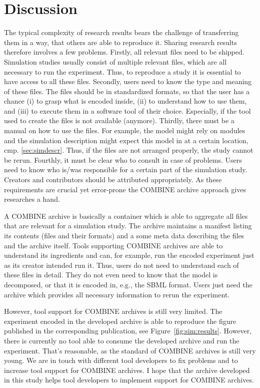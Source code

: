 

\section{Discussion}
The typical complexity of research results bears the challenge of transferring them in a way, that others are able to reproduce it.
Sharing research results therefore involves a few problems.
Firstly, all relevant files need to be shipped.
Simulation studies usually consist of multiple relevant files, which are all necessary to run the experiment.
Thus, to reproduce a study it is essential to have access to all these files.
Secondly, users need to know the type and meaning of these files.
The files should be in standardized formats, so that the user has a chance (i) to grasp what is encoded inside, (ii) to understand how to use them, and (iii) to execute them in a software tool of their choice.
Especially, if the tool used to create the files is not available (anymore).
Thirdly, there must be a manual on how to use the files.
For example, the model might rely on modules and the simulation description might expect this model in at a certain location, cmp. \ref{sec:simdescr}.
Thus, if the files are not arranged properly, the study cannot be rerun.
Fourthly, it must be clear who to consult in case of problems.
Users need to know who is/was responsible for a certain part of the simulation study.
Creators and contributors should be attributed appropriately.
As these requirements are crucial yet error-prone the COMBINE archive approach gives researches a hand.

A COMBINE archive is basically a container which is able to aggregate all files that are relevant for a simulation study.
The archive maintains a manifest listing its contents (files and their formats) and a some meta data describing the files and the archive itself.
Tools supporting COMBINE archives are able to understand its ingredients and can, for example, run the encoded experiment just as its creator intended run it.
Thus, users do not need to understand each of these files in detail.
They do not even need to know that the model is decomposed, or that it is encoded in, e.g., the SBML format.
Users just need the archive which provides all necessary information to rerun the experiment.

However, tool support for COMBINE archives is still very limited.
The experiment encoded in the developed archive is able to reproduce the figure published in the corresponding publication, see Figure~\ref{fig:sim:results}.
However, there is currently no tool able to consume the developed archive and run the experiment.
That's reasonable, as the standard of COMBINE archives is still very young.
We are in touch with different tool developers to fix problems and to increase tool support for COMBINE archives.
I hope that the archive developed in this study helps tool developers to implement support for COMBINE archives.

